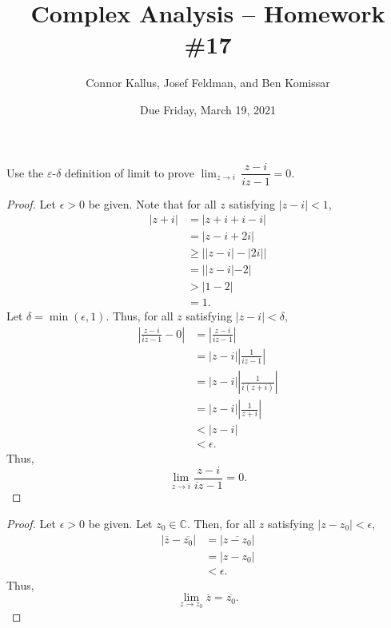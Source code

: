 \documentclass[11pt]{article}       %
\title{Complex Analysis -- Homework \#17}
\author{Connor Kallus, Josef Feldman, and Ben Komissar}
\date{Due Friday, March 19, 2021}
\theoremstyle{definition}
\begin{document}
\color{white}
\pagecolor{black}
\maketitle

  Use the $\varepsilon$-$\delta$ definition of limit to prove $\displaystyle \lim_{z \to i} \, \dfrac{z-i}{iz-1}= 0$.
\begin{proof}
    Let $\epsilon > 0$ be given.
    Note that for all $z$ satisfying $|z-i|<1$,
    \begin{align*}
        |z+i| &= |z+i+i-i| \\
              &= |z-i + 2i| \\
              &\geq \left||z-i| - |2i|\right| \\
              &= ||z-i|-2| \\
              &> |1-2| \\
              &= 1.
    \end{align*}
    Let $\delta = \min(\epsilon, 1)$.
    Thus, for all $z$ satisfying $|z-i| < \delta$,
    \begin{align*}
        \left|\frac{z-i}{iz-1} - 0\right| &= \left|\frac{z-i}{iz-1}\right| \\
                                          &= |z-i|\left| \frac{1}{iz-1} \right| \\
                                          &= |z-i|\left| \frac{1}{i(z+i)} \right| \\
                                          &= |z-i|\left| \frac{1}{z+i} \right| \\
                                          &< |z-i| \\
                                          &< \epsilon.
    \end{align*}
    Thus, $$\lim_{z \to i} \frac{z-i}{iz-1} = 0.$$
\end{proof}

\newpage
{}
\begin{proof}
    Let $\epsilon > 0$ be given.
    Let $z_0 \in \mathbb C$.
    Then, for all $z$ satisfying $|z-z_0| < \epsilon$,
    \begin{align*}
        |\overline z - \overline {z_0}| &= |\overline{z-z_0}| \\
                                        &= |z-z_0| \\
                                        &< \epsilon.
    \end{align*}
    Thus, $$\lim_{z \to z_0} \overline z = \overline {z_0}.$$
\end{proof}
\end{document}
